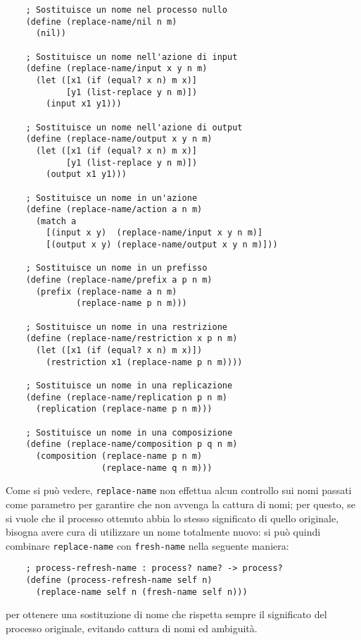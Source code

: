 \begin{lstlisting}
    ; Sostituisce un nome nel processo nullo
    (define (replace-name/nil n m)
      (nil))

    ; Sostituisce un nome nell'azione di input
    (define (replace-name/input x y n m)
      (let ([x1 (if (equal? x n) m x)]
            [y1 (list-replace y n m)])
        (input x1 y1)))

    ; Sostituisce un nome nell'azione di output
    (define (replace-name/output x y n m)
      (let ([x1 (if (equal? x n) m x)]
            [y1 (list-replace y n m)])
        (output x1 y1)))

    ; Sostituisce un nome in un'azione
    (define (replace-name/action a n m)
      (match a
        [(input x y)  (replace-name/input x y n m)]
        [(output x y) (replace-name/output x y n m)]))

    ; Sostituisce un nome in un prefisso
    (define (replace-name/prefix a p n m)
      (prefix (replace-name a n m)
              (replace-name p n m)))

    ; Sostituisce un nome in una restrizione
    (define (replace-name/restriction x p n m)
      (let ([x1 (if (equal? x n) m x)])
        (restriction x1 (replace-name p n m))))

    ; Sostituisce un nome in una replicazione
    (define (replace-name/replication p n m)
      (replication (replace-name p n m)))

    ; Sostituisce un nome in una composizione
    (define (replace-name/composition p q n m)
      (composition (replace-name p n m)
                   (replace-name q n m)))
\end{lstlisting}

Come si pu\`o vedere, \lstinline{replace-name} non effettua alcun
controllo sui nomi passati come parametro per garantire che non avvenga
la cattura di nomi; per questo, se si vuole che il processo ottenuto
abbia lo stesso significato di quello originale, bisogna avere cura di
utilizzare un nome totalmente nuovo: si pu\`o quindi combinare
\lstinline{replace-name} con \lstinline{fresh-name} nella seguente
maniera:

\begin{lstlisting}
    ; process-refresh-name : process? name? -> process?
    (define (process-refresh-name self n)
      (replace-name self n (fresh-name self n)))
\end{lstlisting}

per ottenere una sostituzione di nome che rispetta sempre il significato
del processo originale, evitando cattura di nomi ed ambiguit\`a.

